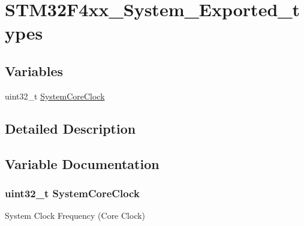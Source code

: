\hypertarget{group___s_t_m32_f4xx___system___exported__types}{\section{S\-T\-M32\-F4xx\-\_\-\-System\-\_\-\-Exported\-\_\-types}
\label{group___s_t_m32_f4xx___system___exported__types}
}
\subsection*{Variables}
\begin{DoxyCompactItemize}
\item 
uint32\-\_\-t \hyperlink{group___s_t_m32_f4xx___system___exported__types_gaa3cd3e43291e81e795d642b79b6088e6}{System\-Core\-Clock}
\end{DoxyCompactItemize}


\subsection{Detailed Description}


\subsection{Variable Documentation}
\hypertarget{group___s_t_m32_f4xx___system___exported__types_gaa3cd3e43291e81e795d642b79b6088e6}{
\subsubsection[{System\-Core\-Clock}]{\setlength{\rightskip}{0pt plus 5cm}uint32\-\_\-t System\-Core\-Clock}}\label{group___s_t_m32_f4xx___system___exported__types_gaa3cd3e43291e81e795d642b79b6088e6}
System Clock Frequency (Core Clock) 